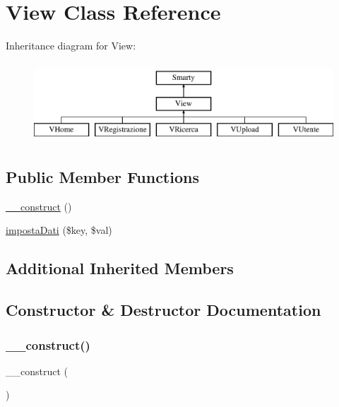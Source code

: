 \hypertarget{class_view}{}\section{View Class Reference}
\label{class_view}
Inheritance diagram for View\+:\begin{figure}[H]
\begin{center}
\leavevmode
\includegraphics[height=3.000000cm]{class_view}
\end{center}
\end{figure}
\subsection*{Public Member Functions}
\begin{DoxyCompactItemize}
\item 
\mbox{\hyperlink{class_view_a095c5d389db211932136b53f25f39685}{\+\_\+\+\_\+construct}} ()
\item 
\mbox{\hyperlink{class_view_a379c40cd4a53d0a9ba6e0beb5ae59b7c}{imposta\+Dati}} (\$key, \$val)
\end{DoxyCompactItemize}
\subsection*{Additional Inherited Members}


\subsection{Constructor \& Destructor Documentation}
\mbox{\label{class_view_a095c5d389db211932136b53f25f39685}} 
\subsubsection{\texorpdfstring{\+\_\+\+\_\+construct()}{\_\_construct()}}
{\footnotesize\ttfamily \+\_\+\+\_\+construct (\begin{DoxyParamCaption}{ }\end{DoxyParamCaption})}

